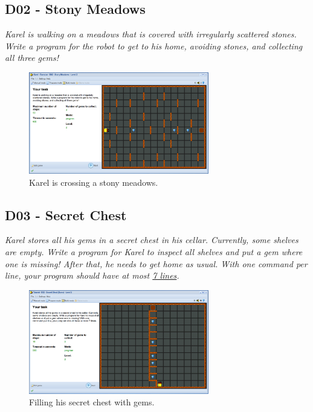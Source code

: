 \documentclass[article,A4,12pt]{llncs}
\begin{document}
\newpage

\subsection{D02 - Stony Meadows}

{\em Karel is walking on a meadows that is covered with irregularly 
scattered stones. Write a program for the robot to get to his home, 
avoiding stones, and collecting all three gems!  }


\begin{figure}[!ht]
\begin{center}
\includegraphics[width=0.7\textwidth]{img/d02.png}
\end{center}
\vspace{-4mm}
\caption{Karel is crossing a stony meadows.}
\label{fig:d02}
\vspace{-4mm}
\end{figure}
\noindent





\subsection{D03 - Secret Chest}

{\em Karel stores all his gems in a secret chest in his cellar. 
Currently, some shelves are empty. Write a program for Karel to 
inspect all shelves and put a gem where one is missing! After that, he needs to get 
home as usual. With one 
command per line, your program should have at most \underline{7 lines}.}

\newpage

\begin{figure}[!ht]
\begin{center}
\includegraphics[width=0.7\textwidth]{img/d03.png}
\end{center}
\vspace{-4mm}
\caption{Filling his secret chest with gems.}
\label{fig:d03}
\vspace{-4mm}
\end{figure}
\noindent
\end{document}
